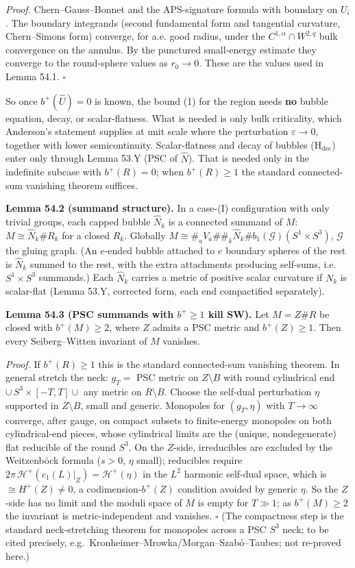 \documentclass[
  10pt,
]{report}
\renewcommand{\backslash}{\mathord{\text{\textbackslash}}}%
\renewcommand{\setminus}{\mathbin{\backslash}}}
\begin{document}
\emph{Proof.} Chern--Gauss--Bonnet and the APS-signature formula with
boundary on \(U_i\). The boundary integrands (second fundamental form
and tangential curvature, Chern--Simons form) converge, for a.e. good
radius, under the \(C^{1,\alpha}\cap W^{2,q}\) bulk convergence on the
annulus. By the punctured small-energy estimate they converge to the
round-sphere values as \(r_0\to0\). These are the values used in Lemma
54.1. \(\square\)

So once \(b^+(\widehat U)=0\) is known, the bound (1) for the region
needs \textbf{no} bubble equation, decay, or scalar-flatness. What is
needed is only bulk criticality, which Anderson's statement supplies at
unit scale where the perturbation \(\varepsilon\to0\), together with
lower semicontinuity. Scalar-flatness and decay of bubbles
(\(\mathrm{H_{dec}}\)) enter only through Lemma 53.Y (PSC of
\(\widehat N\)). That is needed only in the indefinite subcase with
\(b^+(R)=0\); when \(b^+(R)\ge1\) the standard connected-sum vanishing
theorem suffices.

\textbf{Lemma 54.2 (summand structure).} In a case-(I) configuration
with only trivial groups, each capped bubble \(\widehat N_k\) is a
connected summand of \(M\): \(M\cong\widehat N_k\#R_k\) for a closed
\(R_k\). Globally
\(M\cong\#_aV_a\#\#_k\widehat N_k\#b_1(\mathcal G)(S^1\times S^3)\),
\(\mathcal G\) the gluing graph. (An \(e\)-ended bubble attached to
\(e\) boundary spheres of the rest is \(\widehat N_k\) summed to the
rest, with the extra attachments producing self-sums,
i.e.~\(S^1\times S^3\) summands.) Each \(\widehat N_k\) carries a metric
of positive scalar curvature if \(N_k\) is scalar-flat (Lemma 53.Y,
corrected form, each end compactified separately).

\textbf{Lemma 54.3 (PSC summands with \(b^+\ge1\) kill SW).} Let
\(M=Z\#R\) be closed with \(b^+(M)\ge2\), where \(Z\) admits a PSC
metric and \(b^+(Z)\ge1\). Then every Seiberg--Witten invariant of \(M\)
vanishes.

\emph{Proof.} If \(b^+(R)\ge1\) this is the standard connected-sum
vanishing theorem. In general stretch the neck: \(g_T=\) PSC metric on
\(Z\setminus B\) with round cylindrical end
\(\cup\,S^3\times[-T,T]\cup\) any metric on \(R\setminus B\). Choose the
self-dual perturbation \(\eta\) supported in \(Z\setminus B\), small and
generic. Monopoles for \((g_T,\eta)\) with \(T\to\infty\) converge,
after gauge, on compact subsets to finite-energy monopoles on both
cylindrical-end pieces, whose cylindrical limits are the (unique,
nondegenerate) flat reducible of the round \(S^3\). On the \(Z\)-side,
irreducibles are excluded by the Weitzenböck formula (\(s>0\), \(\eta\)
small); reducibles require
\(2\pi\,\mathcal H^+(c_1(L)|_Z)=\mathcal H^+(\eta)\) in the \(L^2\)
harmonic self-dual space, which is \(\cong H^+(Z)\neq0\), a
codimension-\(b^+(Z)\) condition avoided by generic \(\eta\). So the
\(Z\)-side has no limit and the moduli space of \(M\) is empty for
\(T\gg1\); as \(b^+(M)\ge2\) the invariant is metric-independent and
vanishes. \(\square\) (The compactness step is the standard
neck-stretching theorem for monopoles across a PSC \(S^3\) neck; to be
cited precisely, e.g.~Kronheimer--Mrowka/Morgan--Szabó--Taubes; not
re-proved here.)
\end{document}
